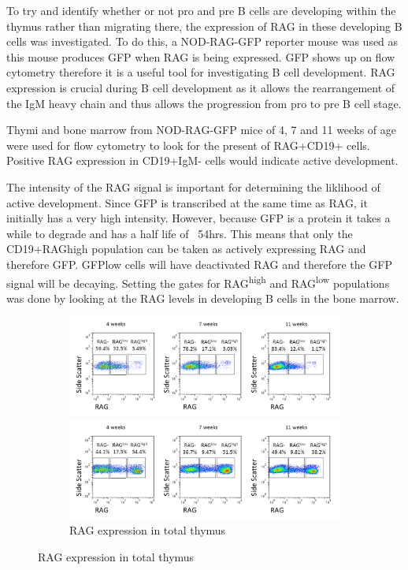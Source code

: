 To try and identify whether or not pro and pre B cells are developing within the thymus rather than migrating there, the expression of RAG in these developing B cells was investigated.
To do this, a NOD-RAG-GFP reporter mouse was used as this mouse produces GFP when RAG is being expressed.
GFP shows up on flow cytometry therefore it is a useful tool for investigating B cell development.
RAG expression is crucial during B cell development as it allows the rearrangement of the IgM heavy chain and thus allows the progression from pro to pre B cell stage.

Thymi and bone marrow from NOD-RAG-GFP mice of 4, 7 and 11 weeks of age were used for flow cytometry to look for the present of RAG+CD19+ cells.
Positive RAG expression in CD19+IgM- cells would indicate active development.

The intensity of the RAG signal is important for determining the liklihood of active development.
Since GFP is transcribed at the same time as RAG, it initially has a very high intensity.
However, because GFP is a protein it takes a while to degrade and has a half life of ~54hrs.
This means that only the CD19+RAGhigh population can be taken as actively expressing RAG and therefore GFP.
GFPlow cells will have deactivated RAG and therefore the GFP signal will be decaying.
Setting the gates for RAG\textsuperscript{high} and RAG\textsuperscript{low} populations was done by looking at the RAG levels in developing B cells in the bone marrow.


\begin{figure}
	\begin{subfigure}{\textwidth}
	\includegraphics[width=\textwidth]{Figures/RAGhighlownegthyB.png}
	\caption{Thymic B cells expressing RAG}
	\includegraphics[width=\textwidth]{Figures/RAGhighlownegtotalthy.png}
	\caption{RAG expression in total thymus}
	\end{subfigure}
\end{figure}


